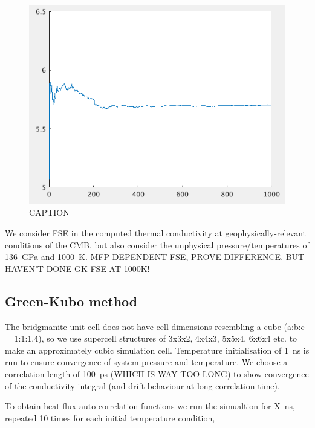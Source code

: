\documentclass[%
preprint,                                  %
nofootinbib,
 amsmath,amssymb,
 aps,
]{revtex4-1}
\begin{document}
\begin{figure}[h!]
  \includegraphics[width=\linewidth]{images/kappa_conv.png}
  \caption{CAPTION}
  \label{fig:kappa_conv}
\end{figure}

We consider FSE in the computed thermal conductivity at geophysically-relevant conditions of the CMB, but also consider the unphysical pressure/temperatures of 136~GPa and 1000~K. 
MFP DEPENDENT FSE, PROVE DIFFERENCE. 
BUT HAVEN'T DONE GK FSE AT 1000K!















\subsection{\label{sec:method.gk}Green-Kubo method}

The bridgmanite unit cell does not have cell dimensions resembling a cube (a:b:c = 1:1:1.4), so we use supercell structures of 3x3x2, 4x4x3, 5x5x4, 6x6x4 etc. to make an approximately cubic simulation cell. Temperature initialisation of 1~ns is run to ensure convergence of system pressure and temperature. We choose a correlation length of 100~ps (WHICH IS WAY TOO LONG) to show convergence of the conductivity integral (and drift behaviour at long correlation time). 

To obtain heat flux auto-correlation functions we run the simualtion for X~ns, repeated 10 times for each initial temperature condition,
\end{document}
